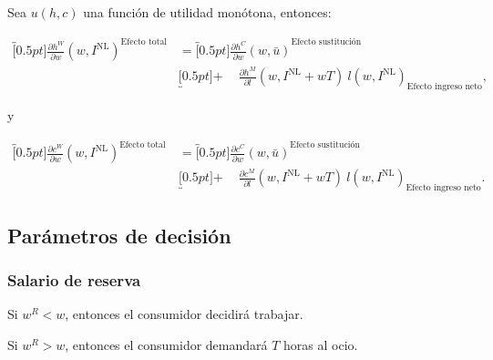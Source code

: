 \documentclass[8pt,a4paper]{extarticle}
\begin{document}
\begin{multicols}{3}
	\begin{boxtheo}
		Sea $u(h, c)$ una función de utilidad monótona, entonces:

		\begin{equation*}
			\begin{aligned}
				\overbracket[0.5pt]{\frac{\partial h^W}{\partial w} (w, I^{\text{NL}})}^{\text{Efecto total}} \quad & = \overbracket[0.5pt]{\frac{\partial h^C}{\partial w} (w, \bar{u})}^{\text{Efecto sustitución}}                                             \\
				                                                                                                    & \underbracket[0.5pt]{ + \quad\ \frac{\partial h^M}{\partial l} (w, I^{\text{NL}} + wT)\ l (w, I^{\text{NL}})}_{\text{Efecto ingreso neto}},
			\end{aligned}
		\end{equation*}

		y

		\begin{equation*}
			\begin{aligned}
				\overbracket[0.5pt]{\frac{\partial c^W}{\partial w} (w, I^{\text{NL}})}^{\text{Efecto total}} \quad & = \overbracket[0.5pt]{\frac{\partial c^C}{\partial w} (w, \bar{u})}^{\text{Efecto sustitución}}                                             \\
				                                                                                                    & \underbracket[0.5pt]{ + \quad\ \frac{\partial c^M}{\partial l} (w, I^{\text{NL}} + wT)\ l (w, I^{\text{NL}})}_{\text{Efecto ingreso neto}}.
			\end{aligned}
		\end{equation*}
	\end{boxtheo}

	\sectionbreak

	\subsection{Parámetros de decisión}

	\subsubsection*{Salario de reserva}

	\begin{eqlist}
		\item Si $ w^R < w $, entonces el consumidor decidirá trabajar.
		\item Si $ w^R > w $, entonces el consumidor demandará $T$ horas al ocio.
	\end{eqlist}


\end{multicols}
\end{document}
